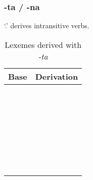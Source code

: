 \documentclass{memoir}
\begin{document}
\subsubsection{-ta / -na}

 `.' derives intransitive verbs.

\begin{table}
\caption{Lexemes derived with \emph{-ta}}
\label{tab:tavbz}
\centering
\begin{tabular}{ll}
\toprule
Base & Derivation \\
\midrule
     &            \\
     &            \\
     &            \\
     &            \\
     &            \\
     &            \\
     &            \\
     &            \\
     &            \\
     &            \\
     &            \\
     &            \\
     &            \\
     &            \\
     &            \\
     &            \\
     &            \\
     &            \\
     &            \\
     &            \\
     &            \\
     &            \\
     &            \\
     &            \\
     &            \\
     &            \\
     &            \\
     &            \\
     &            \\
     &            \\
\bottomrule
\end{tabular}

\end{table}
\end{document}
